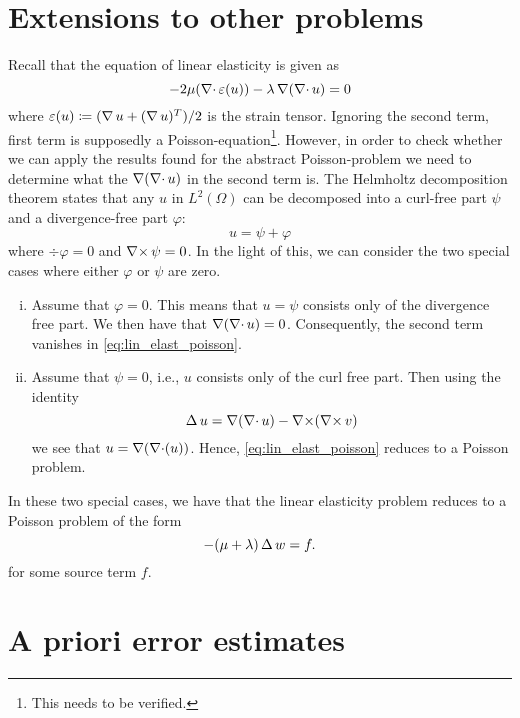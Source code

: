 \section{Extensions to other problems}
\label{sec:extensions_to_other_problems}

Recall that the equation of linear elasticity is given as
\begin{equation}
    \label{eq:lin_elast_poisson}
    - 2 \mu ( \operatorname{\nabla \cdot} \varepsilon(u)) - \lambda \operatorname{\nabla}(\operatorname{\nabla \cdot} u) = 0
\end{equation}
where \(\varepsilon(u) \coloneqq (\operatorname{\nabla} u + (\operatorname{\nabla} u)^T) / 2 \) is the strain
tensor. Ignoring the second term, first term is supposedly a
Poisson-equation\footnote{This needs to be verified.}.  However, in order to
check whether we can apply the results found for the abstract Poisson-problem
we need to determine what the \( \operatorname{\nabla} (\operatorname{\nabla \cdot} u) \) in the second term is. The
Helmholtz decomposition theorem states that any \( u \) in \( L^2(\Omega) \)
can be decomposed into a curl-free part \( \psi \)  and a divergence-free part
\( \varphi \):
\begin{equation}
    u = \psi + \varphi 
\end{equation}
where \(\div \varphi = 0\) and \(  \operatorname{\nabla \times} \psi = 0 \).  In the light of this, we
can consider the two special cases where either \( \varphi \) or \( \psi \) are
zero. 
\begin{enumerate}[(i)]
    \item Assume that \( \varphi = 0 \). This means that \( u = \psi \)
        consists only of the divergence free part. We then have that
        \(\operatorname{\nabla}(\operatorname{\nabla \cdot} u) = 0 \). Consequently, the second term vanishes in
        \cref{eq:lin_elast_poisson}.
    \item Assume that \( \psi = 0 \), i.e., \( u \) consists only of the curl
        free part. Then using the identity
        \begin{equation}
            \operatorname{\Delta} u = \operatorname{\nabla}(\operatorname{\nabla \cdot} u) - \operatorname{\nabla \times}(\operatorname{\nabla \times} v)
        \end{equation}
        we see that \( u = \operatorname{\nabla}(\operatorname{\nabla \cdot}(u)) \). Hence,
        \cref{eq:lin_elast_poisson} reduces to a Poisson problem.
\end{enumerate}
In these two special cases, we have that the linear elasticity problem reduces
to a Poisson problem of the form
\begin{equation}
    -(\mu + \lambda)\operatorname{\Delta} w = f.
\end{equation}
for some source term \( f \).

\section{A priori error estimates}
\label{sec:a_priori_estimates}

